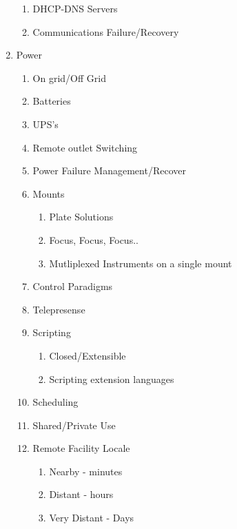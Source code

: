 \documentclass[letter,11pt,oneside]{article}
\begin{document}
\begin{enumerate}
\begin{enumerate}
   \item         DHCP-DNS Servers
   \item     Communications Failure/Recovery
\end{enumerate}

   \item   Power
\vspace{-.15cm}
\begin{enumerate}\addtolength{\itemsep}{-0.5\baselineskip}
   \item      On grid/Off Grid
   \item      Batteries
   \item      UPS's
   \item      Remote outlet Switching
   \item      Power Failure Management/Recover
   \item      Mounts
\vspace{-.15cm}
\begin{enumerate}\addtolength{\itemsep}{-0.5\baselineskip}
   \item            Plate Solutions
   \item            Focus, Focus, Focus..
   \item            Mutliplexed Instruments on a single mount
\end{enumerate}

   \item   Control Paradigms
   \item      Telepresense
   \item      Scripting
\vspace{-.15cm}
\begin{enumerate}\addtolength{\itemsep}{-0.5\baselineskip}
   \item         Closed/Extensible
   \item         Scripting extension languages
\end{enumerate}

   \item      Scheduling
   \item      Shared/Private Use
   \item      Remote Facility Locale
\vspace{-.15cm}
\begin{enumerate}\addtolength{\itemsep}{-0.5\baselineskip}
   \item         Nearby - minutes
   \item         Distant - hours
   \item         Very Distant - Days
\end{enumerate}


\end{enumerate}
\end{enumerate}
\end{document}

